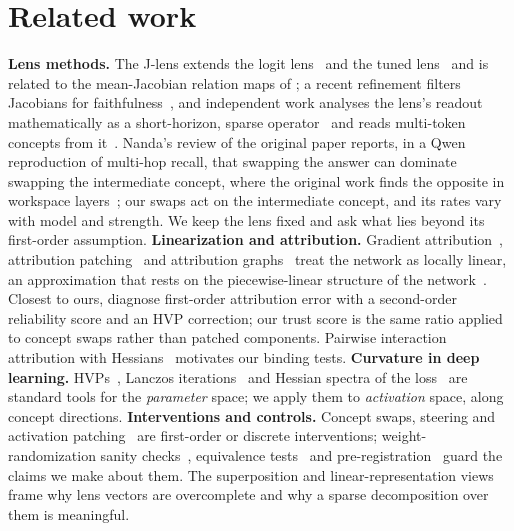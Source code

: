 \documentclass[10pt]{article}
\begin{document}
\section{Related work}
\textbf{Lens methods.} The J-lens extends the logit lens~\citep{nostalgebraist2020logit} and the tuned lens~\citep{belrose2023tuned} and is related to the mean-Jacobian relation maps of \citet{hernandez2024linearity}; a recent refinement filters Jacobians for faithfulness~\citep{ayonrinde2026jpp}, and independent work analyses the lens's readout mathematically as a short-horizon, sparse operator~\citep{yan2026short} and reads multi-token concepts from it~\citep{gong2026firsttoken}. Nanda's review of the original paper reports, in a Qwen reproduction of multi-hop recall, that swapping the answer can dominate swapping the intermediate concept, where the original work finds the opposite in workspace layers~\citep{nanda2026review}; our swaps act on the intermediate concept, and its rates vary with model and strength. We keep the lens fixed and ask what lies beyond its first-order assumption.
\textbf{Linearization and attribution.} Gradient attribution~\citep{sundararajan2017axiomatic}, attribution patching~\citep{nanda2023attribution,syed2023attribution,kramar2024atp} and attribution graphs~\citep{ameisen2025circuit,lindsey2025biology,marks2024sparse} treat the network as locally linear, an approximation that rests on the piecewise-linear structure of the network~\citep{montufar2014number,elhage2021mathematical}. Closest to ours, \citet{zhang2026lies} diagnose first-order attribution error with a second-order reliability score and an HVP correction; our trust score is the same ratio applied to concept swaps rather than patched components. Pairwise interaction attribution with Hessians~\citep{janizek2021explaining} motivates our binding tests.
\textbf{Curvature in deep learning.} HVPs~\citep{pearlmutter1994fast}, Lanczos iterations~\citep{lanczos1950iteration} and Hessian spectra of the loss~\citep{ghorbani2019investigation,yao2020pyhessian} are standard tools for the \emph{parameter} space; we apply them to \emph{activation} space, along concept directions.
\textbf{Interventions and controls.} Concept swaps, steering and activation patching~\citep{meng2022locating,turner2023activation,heimersheim2024activation} are first-order or discrete interventions; weight-randomization sanity checks~\citep{adebayo2018sanity}, equivalence tests~\citep{lakens2017equivalence} and pre-registration~\citep{nosek2018preregistration} guard the claims we make about them. The superposition and linear-representation views~\citep{elhage2022toy,park2023linear,bricken2023monosemanticity,cunningham2023sparse} frame why lens vectors are overcomplete and why a sparse decomposition over them is meaningful.
\end{document}
